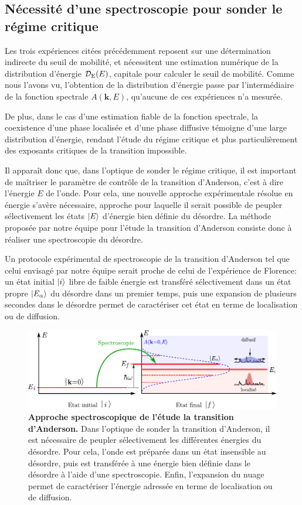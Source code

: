 \subsection{Nécessité d'une spectroscopie pour sonder le régime critique}
Les trois expériences citées précédemment reposent sur une détermination indirecte du seuil de mobilité, et nécessitent une estimation numérique de la distribution d'énergie $\mathcal{D}_{\mathrm{E}}(E)$, capitale pour calculer le seuil de mobilité. Comme nous l'avons vu, l'obtention de la distribution d'énergie passe par l'intermédiaire de la fonction spectrale $A(\mathbf{k},E)$, qu'aucune de ces expériences n'a mesurée. 

De plus, dans le cas d'une estimation fiable de la fonction spectrale, la coexistence d'une phase localisée et d'une phase diffusive témoigne d'une large distribution d'énergie, rendant l'étude du régime critique et plus particulièrement des exposants critiques de la transition impossible.

Il apparaît donc que, dans l'optique de sonder le régime critique, il est important de maîtriser le paramètre de contrôle de la transition d'Anderson, c'est à dire l'énergie $E$ de l'onde. Pour cela, une nouvelle approche expérimentale résolue en énergie s'avère nécessaire, approche pour laquelle il serait possible de peupler sélectivement les états $\left| E \right\rangle$ d'énergie bien définie du désordre. La méthode proposée par notre équipe pour l'étude la transition d'Anderson consiste donc à réaliser une spectroscopie du désordre.





Un protocole expérimental de spectroscopie de la transition d'Anderson tel que celui envisagé par notre équipe serait proche de celui de l'expérience de Florence: un état initial $\left| i \right\rangle$ libre de faible énergie est transféré sélectivement dans un état propre $\left| E_\alpha \right\rangle$ du désordre dans un premier temps, puis une expansion de plusieurs secondes dans le désordre permet de caractériser cet état en terme de localisation ou de diffusion. 




\begin{figure}
\centering
\includegraphics[width=\textwidth]{Fig/Localisation/spectroscopie_anderson.pdf}
\caption{\textbf{Approche spectroscopique de l'étude la transition d'Anderson.} Dans l'optique de sonder la transition d'Anderson, il est nécessaire de peupler sélectivement les différentes énergies du désordre. Pour cela, l'onde est préparée dans un état insensible au désordre, puis est transférée à une énergie bien définie dans le désordre à l'aide d'une spectroscopie. Enfin, l'expansion du nuage permet de caractériser l'énergie adressée en terme de localisation ou de diffusion.}
\label{fig:spectroscopie_anderson}
\end{figure}


